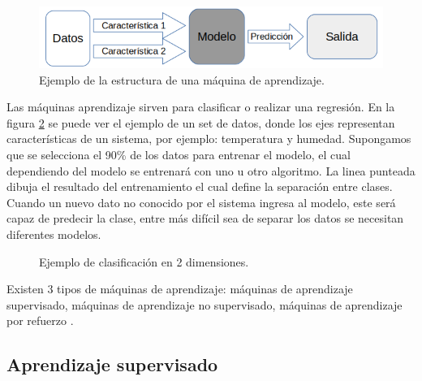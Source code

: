 \documentclass[twoside,spanish,ESP,MSc]{plantillaLabUPV}
\theoremstyle{definition}
\begin{document}
\begin{figure}[h] 
	\centering 
		\includegraphics[scale=.50]{ima_mc/flujoml} 
	\caption{Ejemplo de la estructura de una máquina de aprendizaje.} 
	\label{fml} 
\end{figure}

Las máquinas aprendizaje sirven para clasificar o realizar una regresión. En la figura \ref{fig:clplot} se puede ver el ejemplo de un set de datos, donde los ejes representan características de un sistema, por ejemplo: temperatura y humedad. Supongamos que se selecciona el 90\% de los datos para entrenar el modelo, el cual dependiendo del modelo se entrenará con uno u otro algoritmo.
La linea punteada dibuja el resultado del entrenamiento el cual define la separación entre clases. Cuando un nuevo dato no conocido por el sistema ingresa al modelo, este será capaz de predecir la clase, entre más difícil sea de separar los datos se necesitan diferentes modelos.


\begin{figure}  
\centering
{}
\caption{Ejemplo de clasificación en 2 dimensiones.}
\label{fig:clplot}  
\end{figure}



Existen 3 tipos de máquinas de aprendizaje: máquinas de aprendizaje supervisado, máquinas de aprendizaje no supervisado, máquinas de aprendizaje por refuerzo \cite{supervisadobook}.


\subsection{Aprendizaje supervisado}
\end{document}

